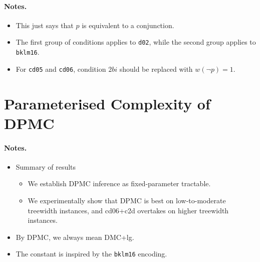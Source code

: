 \documentclass{article}
\theoremstyle{definition}
\theoremstyle{remark}
\begin{document}
\paragraph{Notes.}
\begin{itemize}
\item This just says that $p$ is equivalent to a conjunction.
\item The first group of conditions applies to \texttt{d02}, while the second
  group applies to \texttt{bklm16}.
\item For \texttt{cd05} and \texttt{cd06}, condition $2bi$ should be replaced
  with $w(\neg p) = 1$.
\end{itemize}

\section{Parameterised Complexity of \textsc{DPMC}}

\paragraph{Notes.}
\begin{itemize}
\item Summary of results
  \begin{itemize}
  \item We establish \textsc{DPMC} inference as fixed-parameter tractable.
  \item We experimentally show that \textsc{DPMC} is best on low-to-moderate
    treewidth instances, and cd06+c2d overtakes on higher treewidth instances.
  \end{itemize}
\item By \textsc{DPMC}, we always mean DMC+lg.
\item The constant is inspired by the \texttt{bklm16} encoding.
\end{itemize}
\end{document}
